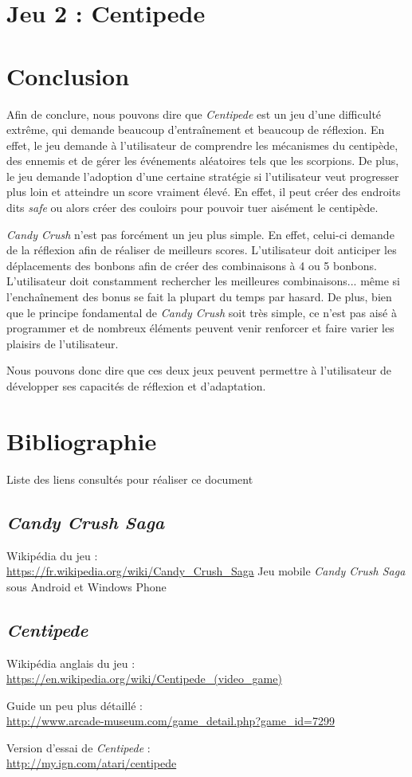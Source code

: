 \documentclass[a4paper, 12pt, oneside]{article}
\newcommand{\oeuvre}[1]{\textit{#1}}
\newcommand{\Candy}{\oeuvre{Candy Crush}\xspace} %
\newcommand{\CandyS}{\oeuvre{Candy Crush Saga}\xspace}
\newcommand{\Centi}{\oeuvre{Centipede}\xspace}
\newcommand{\lien}[2]{\noindent #1 :\\{\small\url{#2}}}
\begin{document}
\section{Jeu 2 : Centipede}


\section{Conclusion}
Afin de conclure, nous pouvons dire que \Centi est un jeu d'une difficulté extrême, qui demande beaucoup d'entraînement et beaucoup de réflexion. En effet, le jeu demande à l'utilisateur de comprendre les mécanismes du centipède, des ennemis et de gérer les événements aléatoires tels que les scorpions. De plus, le jeu demande l'adoption d'une certaine stratégie si l'utilisateur veut progresser plus loin et atteindre un score vraiment élevé. En effet, il peut créer des endroits dits \emph{safe} ou alors créer des couloirs pour pouvoir tuer aisément le centipède.

\Candy n'est pas forcément un jeu plus simple. En effet, celui-ci demande de la réflexion afin de réaliser de meilleurs scores. L'utilisateur doit anticiper les déplacements des bonbons afin de créer des combinaisons à 4 ou 5 bonbons.  L'utilisateur doit constamment rechercher les meilleures combinaisons... même si l'enchaînement des bonus se fait la plupart du temps par hasard. De plus, bien que le principe fondamental de \Candy soit très simple, ce n'est pas aisé à programmer et de nombreux éléments peuvent venir renforcer et faire varier les plaisirs de l'utilisateur. 

Nous pouvons donc dire que ces deux jeux peuvent permettre à l'utilisateur de développer ses capacités de réflexion et d'adaptation.

\newpage
\section{Bibliographie}
Liste des liens consultés pour réaliser ce document

\subsection*{\CandyS}
\lien{Wikipédia du jeu}{https://fr.wikipedia.org/wiki/Candy\_Crush\_Saga}
Jeu mobile \CandyS sous Android et Windows Phone

\subsection*{\Centi}
\lien{Wikipédia anglais du jeu}{https://en.wikipedia.org/wiki/Centipede\_(video\_game)}

\lien{Guide un peu plus détaillé}{http://www.arcade-museum.com/game\_detail.php?game\_id=7299}

\lien{Version d'essai de \Centi}{http://my.ign.com/atari/centipede}
\end{document}

